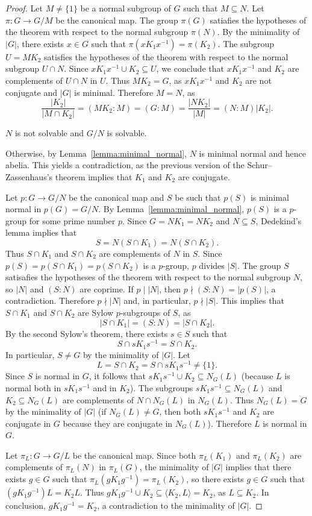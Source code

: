 \begin{proof}
	Let $M\ne\{1\}$ be a normal subgroup of $G$ such that $M\subseteq N$. Let $\pi\colon G\to G/M$
	be the canonical map. The group $\pi(G)$ satiafies the hypotheses of the theorem
	with respect to the normal subgroup $\pi(N)$. By the minimality of $|G|$, there exists 
	$x\in G$ such that $\pi(xK_1x^{-1})=\pi(K_2)$. The subgroup 
	$U=MK_2$ satisfies the hypotheses of the theorem with respect to the normal subgroup 
	$U\cap N$. Since $xK_1x^{-1}\cup K_2\subseteq U$,
	we conclude that $xK_1x^{-1}$ and $K_2$ are complements of $U\cap N$ in $U$.
	Thus $MK_2=G$, as $xK_1x^{-1}$ and $K_2$ are not conjugate and $|G|$ is minimal. 
	Therefore $M=N$, as  
	\[
		\frac{|K_2|}{|M\cap K_2|}=(MK_2:M)=(G:M)=\frac{|NK_2|}{|M|}=(N:M)|K_2|.
	\]

	\begin{claim}
		$N$ is not solvable and $G/N$ is solvable. 
	\end{claim}
	
	Otherwise, by Lemma~\ref{lemma:minimal_normal}, 	$N$ is minimal normal
	and hence abelia. This yields a contradiction, as 
	the previous version of the Schur--Zassenhaus's theorem implies that
	$K_1$ and $K_2$ are conjugate. 
	
	\medskip
	Let $p\colon G\to G/N$ be the canonical map and $S$ be such that $p(S)$
	is minimal normal in $p(G)=G/N$.  By Lemma~\ref{lemma:minimal_normal},
	$p(S)$ is a $p$-group for some prime number $p$.  Since $G=NK_1=NK_2$ and $N\subseteq
	S$, Dedekind's lemma implies that  
	\[
	S=N(S\cap K_1)=N(S\cap K_2).
	\]
	Thus $S\cap K_1$ and $S\cap K_2$
	are complements of $N$ in $S$. Since $p(S)=p(S\cap K_1)=p(S\cap K_2)$ is a $p$-group,
	$p$ divides $|S|$. The group $S$ 
	satisafies the hypotheses of the theorem 
	with respect to the normal subgroup $N$,
	so $|N|$ and $(S:N)$ are coprime. If $p\mid |N|$, then  
	$p\nmid (S:N)=|p(S)|$, a contradiction. Therefore $p\nmid |N|$ and, in particular,  
	$p\nmid |S|$. This implies that $S\cap K_1$ and $S\cap K_2$ are
	Sylow $p$-subgroups of $S$, as 
	\[
		|S\cap K_1|=(S:N)=|S\cap K_2|.
	\]
	By the second Sylow's theorem, there exists $s\in
	S$ such that 
	\[
	S\cap sK_1s^{-1}=S\cap K_2.
	\]
	In particular, $S\ne G$ by the minimality of $|G|$.
	Let  
	\[
		L=S\cap K_2=S\cap sK_1s^{-1}\ne\{1\}.
	\]
	Since $S$ is normal in $G$, it follows that $sK_1s^{-1}\cup K_2\subseteq N_G(L)$ (because $L$
	is normal both in $sK_1s^{-1}$ and in $K_2$). The subgroups $sK_1s^{-1}\subseteq
	N_G(L)$ and $K_2\subseteq N_G(L)$ are complements of $N\cap N_G(L)$ in $N_G(L)$. Thus 
	$N_G(L)=G$ by the minimality of $|G|$ (if $N_G(L)\ne G$, then both 
	$sK_1s^{-1}$ and $K_2$ are conjugate in $G$ because they are conjugate in $N_G(L)$). Therefore 
	$L$ is normal in $G$. 
	
	Let $\pi_L\colon G\to G/L$ be the canonical map. Since both 
	$\pi_L(K_1)$ and $\pi_L(K_2)$ are complements of $\pi_L(N)$ in $\pi_L(G)$, the minimality 
	of $|G|$ implies that there exists $g\in G$ such that $\pi_L(gK_1g^{-1})=\pi_L(K_2)$, so  
	there exists $g\in G$ such that $(gK_1g^{-1})L=K_2L$.  Thus $gK_1g^{-1}\cup
	K_2\subseteq \langle K_2,L\rangle=K_2$, as $L\subseteq K_2$. In conclusion,	
	$gK_1g^{-1}=K_2$, a contradiction to the minimality of $|G|$. 
\end{proof}

